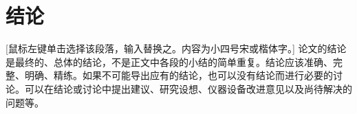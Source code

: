 \chapter{结论}
[鼠标左键单击选择该段落，输入替换之。内容为小四号宋或楷体字。] 论文的结论是最终的、总体的结论，不是正文中各段的小结的简单重复。结论应该准确、完整、明确、精练。如果不可能导出应有的结论，也可以没有结论而进行必要的讨论。可以在结论或讨论中提出建议、研究设想、仪器设备改进意见以及尚待解决的问题等。